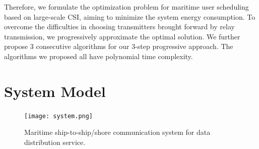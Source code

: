 \documentclass[conference]{IEEEtran}
\begin{document}
 Therefore, we formulate the optimization problem for maritime user scheduling based on large-scale CSI, aiming to minimize the system energy consumption. %
 To overcome the difficulties in choosing transmitters brought forward by relay transmission, we progressively approximate the optimal solution. We further propose 3 consecutive algorithms for our 3-step progressive approach. The algorithms we proposed all have polynomial time complexity.
 
 
 
 
 \section{System Model}\label{sec:2}
 
 \begin{figure} [htb]
 \begin{center}
 \texttt{[image: system.png]}
 \end{center}
 \vspace*{-4mm} 
 \caption{Maritime ship-to-ship/shore communication system for data distribution service.}\label{fig:1}
 \vspace*{-4mm} 
 \end{figure}
 
\end{document}

